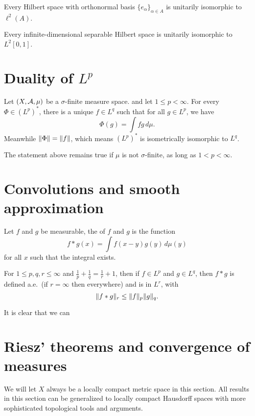 Every Hilbert space with orthonormal basis $\{e_\alpha\}_{\alpha \in A}$ is unitarily isomorphic to $\ell^2(A)$.

Every infinite-dimensional separable Hilbert space is unitarily isomorphic to $L^2[0,1]$.

\section{Duality of \texorpdfstring{$L^p$}{Lp}}

\begin{namedthm}
    Let $(X,\mathcal{A},\mu)$ be a $\sigma$-finite measure space. and let $1\leq p<\infty$. For every $\Phi \in (L^p)^*$, there is a unique $f \in L^q$ such that for all $g \in L^p$, we have \[
        \Phi(g) = \int fg\,d\mu.
    \] Meanwhile $\lVert \Phi \rVert = \lVert f \rVert$, which means $(L^p)^*$ is isometrically isomorphic to $L^q$.

    The statement above remains true if $\mu$ is not $\sigma$-finite, as long as $1 < p < \infty$.
\end{namedthm}

\section{Convolutions and smooth approximation}
Let $f$ and $g$ be measurable, the  of $f$ and $g$ is the function \[
    f * g(x) = \int f(x - y)g(y)\,d\mu(y)
\] for all $x$ such that the integral exists.

\begin{namedthm}
    For $1 \leq p,q,r\leq \infty$ and $\frac{1}{p} + \frac{1}{q} = \frac{1}{r} + 1$, then if $f \in L^p$ and $g \in L^q$, then $f * g$ is defined a.e.\ (if $r = \infty$ then everywhere) and is in $L^r$, with \[
        \lVert f * g \rVert_{r} \leq \lVert f \rVert_p\lVert g \rVert_q.
    \]
\end{namedthm}

It is clear that we can 

\section{Riesz' theorems and convergence of measures}\label{sec:Riesz-thm}
We will let $X$ always be a locally compact metric space in this section. All results in this section can be generalized to locally compact Hausdorff spaces with more sophisticated topological tools and arguments.

